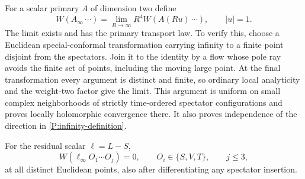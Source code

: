For a scalar primary $A$ of dimension two define
\begin{equation}
 W(A_\infty\,\cdots)=\lim_{R\to\infty}R^4W(A(Ru)\,\cdots),
 \qquad |u|=1.
 \label{P:infinity-definition}
\end{equation}
The limit exists and has the primary transport law.  To verify this,
choose a Euclidean special-conformal transformation carrying infinity
to a finite point disjoint from the spectators.  Join it to the
identity by a flow whose pole ray avoids the finite set of points,
including the moving large point.  At the final transformation every
argument is distinct and finite, so ordinary local analyticity and the
weight-two factor give the limit.  This argument is uniform on small
complex neighborhoods of strictly time-ordered spectator
configurations and proves locally holomorphic convergence there.  It
also proves independence of the direction in
\eqref{P:infinity-definition}.

\begin{proposition}
\label{P:residual-infinity}
For the residual scalar $\ell=L-S$,
\begin{equation}
 W(\ell_\infty O_1\cdots O_j)=0,
 \qquad O_i\in\{S,V,T\},\qquad j\leq3,
 \label{P:accessible-decoupling}
\end{equation}
at all distinct Euclidean points, also after differentiating any
spectator insertion.
\end{proposition}

